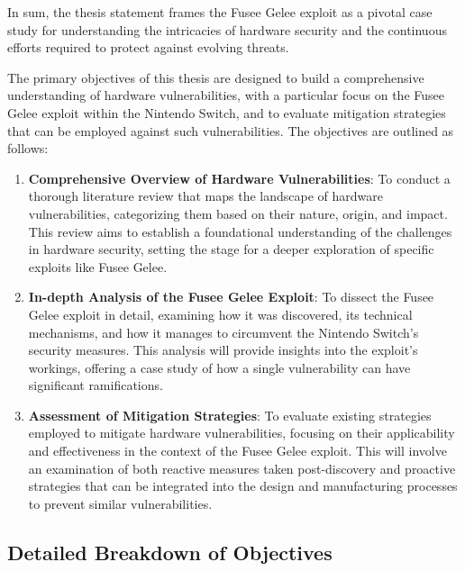 In sum, the thesis statement frames the Fusee Gelee exploit as a pivotal
case study for understanding the intricacies of hardware security and
the continuous efforts required to protect against evolving threats.

The primary objectives of this thesis are designed to build a
comprehensive understanding of hardware vulnerabilities, with a
particular focus on the Fusee Gelee exploit within the Nintendo Switch,
and to evaluate mitigation strategies that can be employed against such
vulnerabilities. The objectives are outlined as follows:

\begin{enumerate}
\def\labelenumi{\arabic{enumi}.}
\item
  \textbf{Comprehensive Overview of Hardware Vulnerabilities}: To
  conduct a thorough literature review that maps the landscape of
  hardware vulnerabilities, categorizing them based on their nature,
  origin, and impact. This review aims to establish a foundational
  understanding of the challenges in hardware security, setting the
  stage for a deeper exploration of specific exploits like Fusee Gelee.
\item
  \textbf{In-depth Analysis of the Fusee Gelee Exploit}: To dissect the
  Fusee Gelee exploit in detail, examining how it was discovered, its
  technical mechanisms, and how it manages to circumvent the Nintendo
  Switch's security measures. This analysis will provide insights into
  the exploit's workings, offering a case study of how a single
  vulnerability can have significant ramifications.
\item
  \textbf{Assessment of Mitigation Strategies}: To evaluate existing
  strategies employed to mitigate hardware vulnerabilities, focusing on
  their applicability and effectiveness in the context of the Fusee
  Gelee exploit. This will involve an examination of both reactive
  measures taken post-discovery and proactive strategies that can be
  integrated into the design and manufacturing processes to prevent
  similar vulnerabilities.
\end{enumerate}

\hypertarget{detailed-breakdown-of-objectives}{%
\subsection{Detailed Breakdown of
Objectives}\label{detailed-breakdown-of-objectives}}


